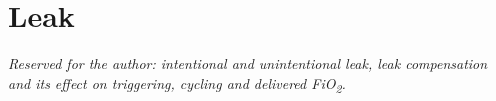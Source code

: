 \chapter{Leak}
\label{ch:leak}

\begin{authornote}
\emph{Reserved for the author: intentional and unintentional leak, leak compensation and its effect on triggering, cycling and delivered FiO\textsubscript{2}.}
\end{authornote}
